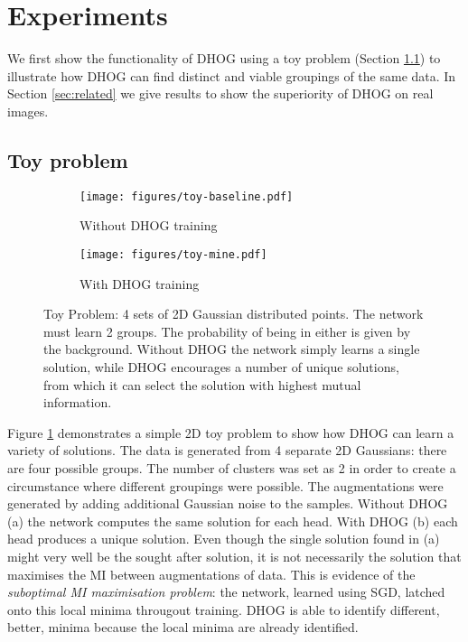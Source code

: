\documentclass[runningheads]{llncs}
\begin{document}
\vspace{5mm}
\section{Experiments}\label{sec:experiments}
We first show the functionality of DHOG using a toy problem (Section \ref{sec:toyexp}) to illustrate how DHOG can find distinct and viable groupings of the same data. In Section \ref{sec:related} we give results to show the superiority of DHOG on real images. \vspace{-1mm}

\subsection{Toy problem}\label{sec:toyexp}
\begin{figure}[!htbp]
\begin{center}
\begin{subfigure}{0.48\textwidth}
\texttt{[image: figures/toy-baseline.pdf]}
\caption{Without DHOG training}
\end{subfigure}
\begin{subfigure}{0.48\textwidth}
\texttt{[image: figures/toy-mine.pdf]}
\caption{With DHOG training}
\end{subfigure}
\end{center}
  \caption{Toy Problem: 4 sets of 2D Gaussian distributed points. The network must learn 2 groups. The probability of being in either is given by the background. Without DHOG the network simply learns a single solution, while DHOG encourages a number of unique solutions, from which it can select the solution with highest mutual information. }
\label{fig:toy}
\end{figure}

Figure \ref{fig:toy} demonstrates a simple 2D toy problem to show how DHOG can learn a variety of solutions. The data is generated from 4 separate 2D Gaussians: there are four possible groups. The number of clusters was set as 2 in order to create a circumstance where different groupings were possible. The augmentations were generated by adding additional Gaussian noise to the samples. Without DHOG (a) the network computes the same solution for each head. With DHOG (b) each head produces a unique solution. Even though the single solution found in (a) might very well be the sought after solution, it is not necessarily the solution that maximises the MI between augmentations of data. This is evidence of the \emph{suboptimal MI maximisation problem}: the network, learned using SGD, latched onto this local minima througout training. DHOG is able to identify different, better, minima because the local minima are already identified.
\end{document}
